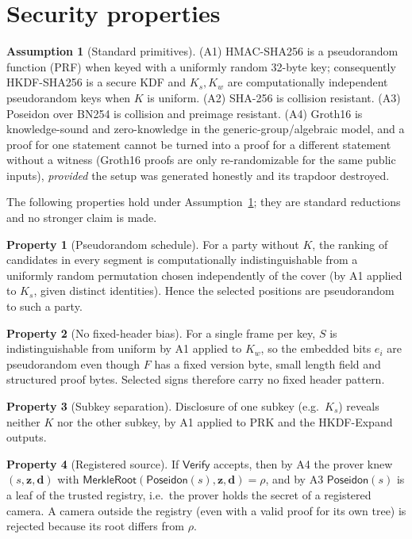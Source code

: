 \documentclass[11pt,a4paper]{article}
\theoremstyle{definition}
\newtheorem{assumption}{Assumption}
\newtheorem{property}{Property}
\theoremstyle{remark}
\newcommand{\Pos}{\mathsf{Poseidon}}
\begin{document}
\section{Security properties}
\begin{assumption}[Standard primitives]\label{ass:prf}
(A1) HMAC-SHA256 is a pseudorandom function (PRF) when keyed with a uniformly
random 32-byte key; consequently HKDF-SHA256 is a secure KDF and $K_s,K_w$ are
computationally independent pseudorandom keys when $K$ is uniform. (A2) SHA-256
is collision resistant. (A3) Poseidon over BN254 is collision and preimage
resistant. (A4) Groth16 is knowledge-sound and zero-knowledge in the
generic-group/algebraic model, and a proof for one statement cannot be turned
into a proof for a different statement without a witness (Groth16 proofs are
only re-randomizable for the same public inputs), \emph{provided} the setup was
generated honestly and its trapdoor destroyed.
\end{assumption}

The following properties hold under Assumption~\ref{ass:prf}; they are
standard reductions and no stronger claim is made.

\begin{property}[Pseudorandom schedule]
For a party without $K$, the ranking of candidates in every segment is
computationally indistinguishable from a uniformly random permutation chosen
independently of the cover (by A1 applied to $K_s$, given distinct
identities). Hence the selected positions are pseudorandom to such a party.
\end{property}

\begin{property}[No fixed-header bias]
For a single frame per key, $S$ is indistinguishable from uniform by A1 applied
to $K_w$, so the embedded bits $e_i$ are pseudorandom even though $F$ has a
fixed version byte, small length field and structured proof bytes. Selected
signs therefore carry no fixed header pattern.
\end{property}

\begin{property}[Subkey separation]
Disclosure of one subkey (e.g.\ $K_s$) reveals neither $K$ nor the other
subkey, by A1 applied to $\mathrm{PRK}$ and the HKDF-Expand outputs.
\end{property}

\begin{property}[Registered source]
If $\mathsf{Verify}$ accepts, then by A4 the prover knew $(s,\mathbf{z},\mathbf{d})$
with $\mathsf{MerkleRoot}(\Pos(s),\mathbf{z},\mathbf{d})=\rho$, and by A3
$\Pos(s)$ is a leaf of the trusted registry, i.e.\ the prover holds the secret of
a registered camera. A camera outside the registry (even with a valid proof
for its own tree) is rejected because its root differs from $\rho$.
\end{property}
\end{document}
